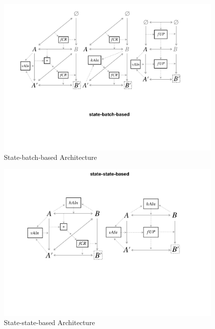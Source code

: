 \begin{figure}[tb!]
	\centering
	\includegraphics[width=\columnwidth]{diagrams/state-batch-based}
	\caption{State-batch-based Architecture}
	\label{fig:stateBatchBased}
\end{figure}

\begin{figure}[tb!]
	\centering
	\includegraphics[width=\columnwidth]{diagrams/state-state-based}
	\caption{State-state-based Architecture}
	\label{fig:stateStateBased}
\end{figure}

